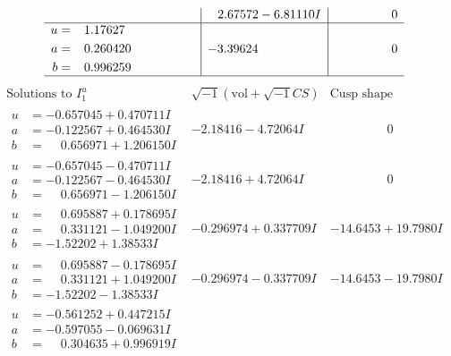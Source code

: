 \documentclass[1p]{elsarticle_modified}
\theoremstyle{definition}
\newcommand{\I}{\sqrt{-1}}
\begin{document}
$$\begin{array}{c|c|c}
 & \phantom{-}2.67572 - 6.81110 I & \phantom{-0.000000 } 0 \\ \hline\begin{aligned}
u &= \phantom{-}1.17627\phantom{ +0.000000I} \\
a &= \phantom{-}0.260420\phantom{ +0.000000I} \\
b &= \phantom{-}0.996259\phantom{ +0.000000I}\end{aligned}
 & -3.39624\phantom{ +0.000000I} & \phantom{-0.000000 } 0\\
 \hline 
 \end{array}$$\newpage$$\begin{array}{c|c|c}  
\text{Solutions to }I^u_{1}& \I (\text{vol} + \sqrt{-1}CS) & \text{Cusp shape}\\
 \hline 
\begin{aligned}
u &= -0.657045 + 0.470711 I \\
a &= -0.122567 + 0.464530 I \\
b &= \phantom{-}0.656971 + 1.206150 I\end{aligned}
 & -2.18416 - 4.72064 I & \phantom{-0.000000 } 0 \\ \hline\begin{aligned}
u &= -0.657045 - 0.470711 I \\
a &= -0.122567 - 0.464530 I \\
b &= \phantom{-}0.656971 - 1.206150 I\end{aligned}
 & -2.18416 + 4.72064 I & \phantom{-0.000000 } 0 \\ \hline\begin{aligned}
u &= \phantom{-}0.695887 + 0.178695 I \\
a &= \phantom{-}0.331121 - 1.049200 I \\
b &= -1.52202 + 1.38533 I\end{aligned}
 & -0.296974 + 0.337709 I & -14.6453 + 19.7980 I \\ \hline\begin{aligned}
u &= \phantom{-}0.695887 - 0.178695 I \\
a &= \phantom{-}0.331121 + 1.049200 I \\
b &= -1.52202 - 1.38533 I\end{aligned}
 & -0.296974 - 0.337709 I & -14.6453 - 19.7980 I \\ \hline\begin{aligned}
u &= -0.561252 + 0.447215 I \\
a &= -0.597055 - 0.069631 I \\
b &= \phantom{-}0.304635 + 0.996919 I\end{aligned}

\end{array}$$
\end{document}
